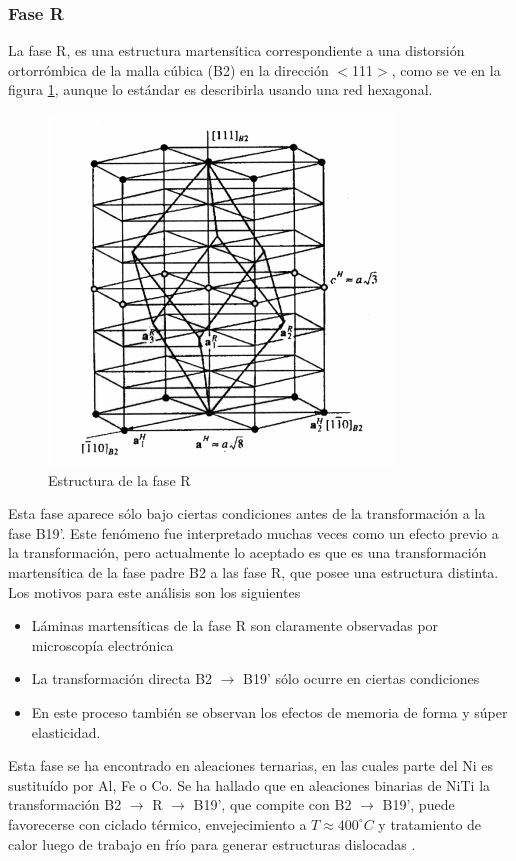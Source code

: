 \documentclass[12pt]{article}
\theoremstyle{definition}
\theoremstyle{remark}
\begin{document}
\subsubsection{Fase R}
La fase R, es una estructura martensítica correspondiente a una distorsión
ortorrómbica de la malla cúbica (B2) en la dirección $<$111$>$, como se ve en la figura \ref{RPhase}, aunque lo estándar es describirla usando una red hexagonal.
\begin{figure}[H]
	\centering	
	\includegraphics[scale=0.4]{img/RPhase.png}
	\caption{Estructura de la fase R}
	\label{RPhase}
\end{figure}

Esta fase aparece sólo bajo ciertas condiciones antes de la transformación a la fase B19'. Este fenómeno fue interpretado muchas veces como un efecto previo a la transformación, pero actualmente lo aceptado es que es una transformación martensítica de la fase padre B2 a las fase R, que posee una estructura distinta. Los motivos para este análisis son los siguientes
\begin{itemize}
	\item Láminas martensíticas de la fase R son claramente observadas por microscopía electrónica
	\item La transformación directa B2 $\rightarrow$ B19' sólo ocurre en ciertas condiciones
	\item En este proceso también se observan los efectos de memoria de forma y súper elasticidad.
\end{itemize}


Esta fase se ha encontrado en aleaciones ternarias, en las cuales parte del Ni es sustituído por Al, Fe o Co. Se ha hallado que en  aleaciones binarias de NiTi la transformación B2 $\rightarrow$ R $\rightarrow$ B19', que compite con B2 $\rightarrow$ B19', puede favorecerse con ciclado térmico, envejecimiento a $T \approx 400 ^\circ C$ y tratamiento de calor luego de trabajo en frío para generar estructuras dislocadas \citep{Santamarta}\citep{ThinFilm}\cite{TiNi}. 
\end{document}
